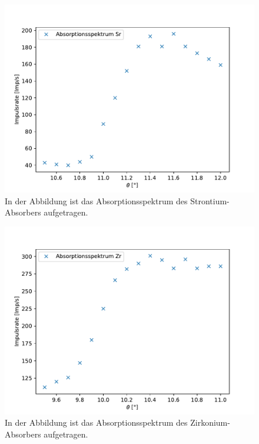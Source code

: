 \documentclass[titlepage = firstcover]{scrartcl}
\begin{document}
            \begin{figure}[h]
              \centering
              \includegraphics{Strontium.pdf}
              \caption{In der Abbildung ist das Absorptionsspektrum des Strontium-Absorbers aufgetragen.}
              \label{fig:Strontium}
            \end{figure}

            \begin{figure}[h]
              \centering
              \includegraphics{Zirkonium.pdf}
              \caption{In der Abbildung ist das Absorptionsspektrum des Zirkonium-Absorbers aufgetragen.}
              \label{fig:Zirkonium}
            \end{figure}
            \FloatBarrier
\end{document}
